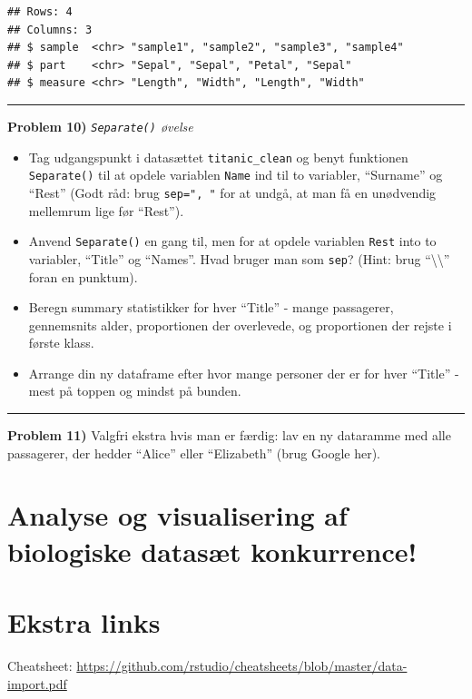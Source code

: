 \documentclass[
]{book}
\providecommand{\tightlist}{%
  \setlength{\itemsep}{0pt}\setlength{\parskip}{0pt}}
\begin{document}
\begin{verbatim}
## Rows: 4
## Columns: 3
## $ sample  <chr> "sample1", "sample2", "sample3", "sample4"
## $ part    <chr> "Sepal", "Sepal", "Petal", "Sepal"
## $ measure <chr> "Length", "Width", "Length", "Width"
\end{verbatim}

\begin{center}\rule{0.5\linewidth}{0.5pt}\end{center}

\textbf{Problem 10)} \emph{\texttt{Separate()} øvelse}

\begin{itemize}
\tightlist
\item
  Tag udgangspunkt i datasættet \texttt{titanic\_clean} og benyt funktionen \texttt{Separate()} til at opdele variablen \texttt{Name} ind til to variabler, ``Surname'' og ``Rest'' (Godt råd: brug \texttt{sep=",\ "} for at undgå, at man få en unødvendig mellemrum lige før ``Rest'').
\item
  Anvend \texttt{Separate()} en gang til, men for at opdele variablen \texttt{Rest} into to variabler, ``Title'' og ``Names''. Hvad bruger man som \texttt{sep}? (Hint: brug ``\textbackslash\textbackslash{}'' foran en punktum).
\item
  Beregn summary statistikker for hver ``Title'' - mange passagerer, gennemsnits alder, proportionen der overlevede, og proportionen der rejste i første klass.
\item
  Arrange din ny dataframe efter hvor mange personer der er for hver ``Title'' - mest på toppen og mindst på bunden.
\end{itemize}

\begin{center}\rule{0.5\linewidth}{0.5pt}\end{center}

\textbf{Problem 11)} Valgfri ekstra hvis man er færdig: lav en ny dataramme med alle passagerer, der hedder ``Alice'' eller ``Elizabeth'' (brug Google her).

\hypertarget{analyse-og-visualisering-af-biologiske-datasuxe6t-konkurrence}{%
\section{Analyse og visualisering af biologiske datasæt konkurrence!}\label{analyse-og-visualisering-af-biologiske-datasuxe6t-konkurrence}}

\hypertarget{ekstra-links-2}{%
\section{Ekstra links}\label{ekstra-links-2}}

Cheatsheet: \url{https://github.com/rstudio/cheatsheets/blob/master/data-import.pdf}

  
\end{document}
